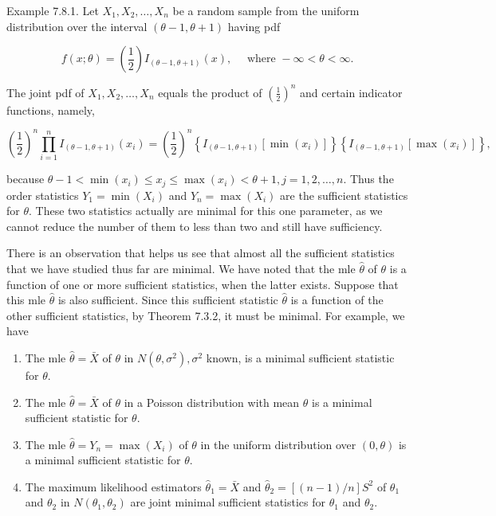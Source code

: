 Example 7.8.1. Let $X_{1}, X_{2}, \ldots, X_{n}$ be a random sample from the uniform distribution over the interval $(\theta-1, \theta+1)$ having pdf

$$
f(x ; \theta)=\left(\frac{1}{2}\right) I_{(\theta-1, \theta+1)}(x), \quad \text { where }-\infty<\theta<\infty .
$$

The joint pdf of $X_{1}, X_{2}, \ldots, X_{n}$ equals the product of $\left(\frac{1}{2}\right)^{n}$ and certain indicator functions, namely,

$$
\left(\frac{1}{2}\right)^{n} \prod_{i=1}^{n} I_{(\theta-1, \theta+1)}\left(x_{i}\right)=\left(\frac{1}{2}\right)^{n}\left\{I_{(\theta-1, \theta+1)}\left[\min \left(x_{i}\right)\right]\right\}\left\{I_{(\theta-1, \theta+1)}\left[\max \left(x_{i}\right)\right]\right\},
$$

because $\theta-1<\min \left(x_{i}\right) \leq x_{j} \leq \max \left(x_{i}\right)<\theta+1, j=1,2, \ldots, n$. Thus the order statistics $Y_{1}=\min \left(X_{i}\right)$ and $Y_{n}=\max \left(X_{i}\right)$ are the sufficient statistics for $\theta$. These two statistics actually are minimal for this one parameter, as we cannot reduce the number of them to less than two and still have sufficiency.

There is an observation that helps us see that almost all the sufficient statistics that we have studied thus far are minimal. We have noted that the mle $\hat{\theta}$ of $\theta$ is a function of one or more sufficient statistics, when the latter exists. Suppose that this mle $\hat{\theta}$ is also sufficient. Since this sufficient statistic $\hat{\theta}$ is a function of the other sufficient statistics, by Theorem 7.3.2, it must be minimal. For example, we have

\begin{enumerate}
  \item The mle $\hat{\theta}=\bar{X}$ of $\theta$ in $N\left(\theta, \sigma^{2}\right), \sigma^{2}$ known, is a minimal sufficient statistic for $\theta$.
  \item The mle $\hat{\theta}=\bar{X}$ of $\theta$ in a Poisson distribution with mean $\theta$ is a minimal sufficient statistic for $\theta$.
  \item The mle $\hat{\theta}=Y_{n}=\max \left(X_{i}\right)$ of $\theta$ in the uniform distribution over $(0, \theta)$ is a minimal sufficient statistic for $\theta$.
  \item The maximum likelihood estimators $\hat{\theta}_{1}=\bar{X}$ and $\hat{\theta}_{2}=[(n-1) / n] S^{2}$ of $\theta_{1}$ and $\theta_{2}$ in $N\left(\theta_{1}, \theta_{2}\right)$ are joint minimal sufficient statistics for $\theta_{1}$ and $\theta_{2}$.
\end{enumerate}

